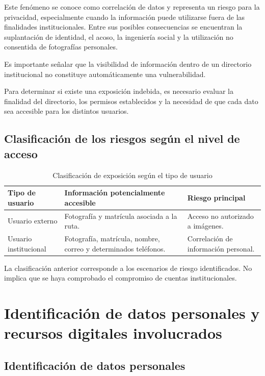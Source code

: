 \documentclass[12pt]{article}
\begin{document}
Este fenómeno se conoce como
correlación de datos y representa
un riesgo para la privacidad,
especialmente cuando la información
puede utilizarse fuera de las
finalidades institucionales. Entre sus posibles consecuencias
se encuentran la suplantación
de identidad, el acoso,
la ingeniería social y
la utilización no consentida
de fotografías personales.

Es importante señalar que
la visibilidad de información
dentro de un directorio
institucional no constituye
automáticamente una vulnerabilidad.

Para determinar si existe
una exposición indebida,
es necesario evaluar la
finalidad del directorio,
los permisos establecidos
y la necesidad de que
cada dato sea accesible
para los distintos usuarios.

\subsection{Clasificación de los riesgos
según el nivel de acceso}

\begin{table}[H]
\centering
\caption{Clasificación de exposición
según el tipo de usuario}
\label{tab:niveles_exposicion}
\small
\begin{tabularx}{\textwidth}{|X|X|X|}
\hline
\textbf{Tipo de usuario} &
\textbf{Información potencialmente accesible} &
\textbf{Riesgo principal} \\ \hline

Usuario externo &
Fotografía y matrícula
asociada a la ruta. &
Acceso no autorizado
a imágenes. \\ \hline

Usuario institucional &
Fotografía, matrícula,
nombre, correo y
determinados teléfonos. &
Correlación de información
personal. \\ \hline

\end{tabularx}
\end{table}

La clasificación anterior
corresponde a los escenarios
de riesgo identificados.
No implica que se haya
comprobado el compromiso
de cuentas institucionales.


\section{Identificación de datos personales
y recursos digitales involucrados}

\subsection{Identificación de datos personales}
\end{document}
